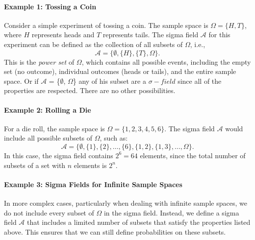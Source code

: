     
    \paragraph{Example 1: Tossing a Coin}
    Consider a simple experiment of tossing a coin. The sample space is $\Omega = \{H, T\}$, where $H$ represents heads and $T$ represents tails. The sigma field $\mathcal{A}$ for this experiment can be defined as the collection of all subsets of $\Omega$, i.e.,
    \[
    \mathcal{A} = \{ \emptyset, \{H\}, \{T\}, \Omega \}.
    \]
    This is the \textit{power set} of $\Omega$, which contains all possible events, including the empty set (no outcome), individual outcomes (heads or tails), and the entire sample space. \newline
    Or if $\mathcal{A}$ = \{$\emptyset$, $\Omega$\} any of his subset are a $\sigma-field$ since all of the properties are respected. There are no other possibilities.
    
    \paragraph{Example 2: Rolling a Die}
    For a die roll, the sample space is $\Omega = \{1, 2, 3, 4, 5, 6\}$. The sigma field $\mathcal{A}$ would include all possible subsets of $\Omega$, such as:
    \[
    \mathcal{A} = \{ \emptyset, \{1\}, \{2\}, \dots, \{6\}, \{1, 2\}, \{1, 3\}, \dots, \Omega \}.
    \]
    In this case, the sigma field contains $2^6 = 64$ elements, since the total number of subsets of a set with $n$ elements is $2^n$.
    
    \paragraph{Example 3: Sigma Fields for Infinite Sample Spaces}
    In more complex cases, particularly when dealing with infinite sample spaces, we do not include every subset of $\Omega$ in the sigma field. Instead, we define a sigma field $\mathcal{A}$ that includes a limited number of subsets that satisfy the properties listed above. This ensures that we can still define probabilities on these subsets.
    
